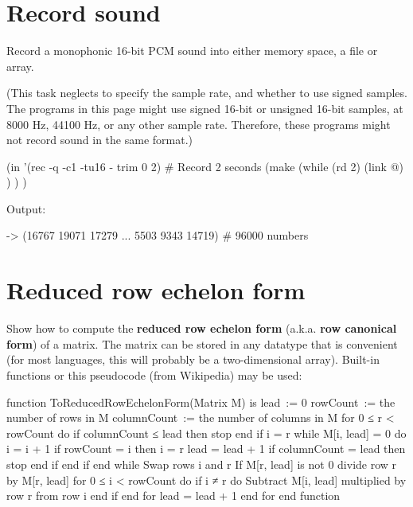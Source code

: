 \pagebreak{}
\section*{Record sound}

Record a monophonic 16-bit PCM sound into either memory space, a file
or array.

(This task neglects to specify the sample rate, and whether to use
signed samples. The programs in this page might use signed 16-bit or
unsigned 16-bit samples, at 8000 Hz, 44100 Hz, or any other sample
rate. Therefore, these programs might not record sound in the same
format.)


\begin{wideverbatim}

(in '(rec -q -c1 -tu16 - trim 0 2)  # Record 2 seconds
   (make
      (while (rd 2)
         (link @) ) ) )

Output:

-> (16767 19071 17279 ... 5503 9343 14719)  # 96000 numbers

\end{wideverbatim}

\pagebreak{}
\section*{Reduced row echelon form}

Show how to compute the \textbf{reduced row echelon form} (a.k.a.
\textbf{row canonical form}) of a matrix. The matrix can be stored in
any datatype that is convenient (for most languages, this will probably
be a two-dimensional array). Built-in functions or this pseudocode (from
Wikipedia) may be used:

\begin{wideverbatim}
function ToReducedRowEchelonForm(Matrix M) is
    lead := 0
    rowCount := the number of rows in M
    columnCount := the number of columns in M
    for 0 ≤ r < rowCount do
        if columnCount ≤ lead then
            stop
        end if
        i = r
        while M[i, lead] = 0 do
            i = i + 1
            if rowCount = i then
                i = r
                lead = lead + 1
                if columnCount = lead then
                    stop
                end if
            end if
        end while
        Swap rows i and r
        If M[r, lead] is not 0 divide row r by M[r, lead]
        for 0 ≤ i < rowCount do
            if i ≠ r do
                Subtract M[i, lead] multiplied by row r from row i
            end if
        end for
        lead = lead + 1
    end for
end function
\end{wideverbatim}

